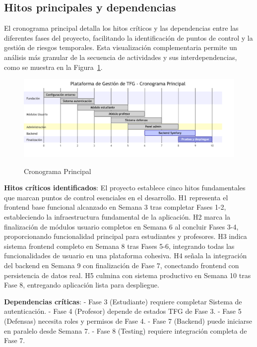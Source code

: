\documentclass[12pt,a4paper,oneside]{report}
\providecommand{\pandocbounded}[1]{#1}
\begin{document}
\subsection{Hitos principales y
dependencias}\label{hitos-principales-y-dependencias}

El cronograma principal detalla los hitos críticos y las dependencias entre las diferentes fases del proyecto, facilitando la identificación de puntos de control y la gestión de riesgos temporales. Esta visualización complementaria permite un análisis más granular de la secuencia de actividades y sus interdependencias, como se muestra en la Figura~\ref{fig:cronograma-principal}.

\begin{figure}[H]
\centering
\pandocbounded{\includegraphics[keepaspectratio,alt={Cronograma Principal}]{processed/images/03_planificacion_mermaid_1.png}}
\caption{Cronograma Principal}
\label{fig:cronograma-principal}
\end{figure}

\textbf{Hitos críticos identificados}: El proyecto establece cinco hitos fundamentales que marcan puntos de control esenciales en el desarrollo. H1 representa el frontend base funcional alcanzado en Semana 3 tras completar Fases 1-2, estableciendo la infraestructura fundamental de la aplicación. H2 marca la finalización de módulos usuario completos en Semana 6 al concluir Fases 3-4, proporcionando funcionalidad principal para estudiantes y profesores. H3 indica sistema frontend completo en Semana 8 tras Fases 5-6, integrando todas las funcionalidades de usuario en una plataforma cohesiva. H4 señala la integración del backend en Semana 9 con finalización de Fase 7, conectando frontend con persistencia de datos real. H5 culmina con sistema productivo en Semana 10 tras Fase 8, entregando aplicación lista para despliegue.

\textbf{Dependencias críticas}: - Fase 3 (Estudiante) requiere completar
Sistema de autenticación. - Fase 4 (Profesor) depende de estados TFG de
Fase 3. - Fase 5 (Defensas) necesita roles y permisos de Fase 4. - Fase
7 (Backend) puede iniciarse en paralelo desde Semana 7. - Fase 8
(Testing) requiere integración completa de Fase 7.
\end{document}
